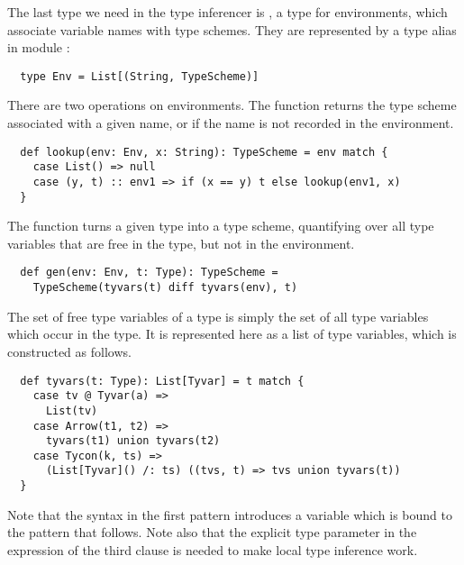 {The last type we need in the type inferencer is
, a type for environments, which associate variable names
with type schemes. They are represented by a type alias  in
module :
\begin{lstlisting}
  type Env = List[(String, TypeScheme)]
\end{lstlisting}
There are two operations on environments. The  function
returns the type scheme associated with a given name, or 
if the name is not recorded in the environment.
\begin{lstlisting}
  def lookup(env: Env, x: String): TypeScheme = env match {
    case List() => null
    case (y, t) :: env1 => if (x == y) t else lookup(env1, x)
  }
\end{lstlisting}
The  function turns a given type into a type scheme,
quantifying over all type variables that are free in the type, but
not in the environment.
\begin{lstlisting}
  def gen(env: Env, t: Type): TypeScheme = 
    TypeScheme(tyvars(t) diff tyvars(env), t)
\end{lstlisting}
The set of free type variables of a type is simply the set of all type
variables which occur in the type. It is represented here as a list of
type variables, which is constructed as follows.
\begin{lstlisting}
  def tyvars(t: Type): List[Tyvar] = t match {
    case tv @ Tyvar(a) => 
      List(tv)
    case Arrow(t1, t2) => 
      tyvars(t1) union tyvars(t2)
    case Tycon(k, ts) => 
      (List[Tyvar]() /: ts) ((tvs, t) => tvs union tyvars(t))
  }
\end{lstlisting}
Note that the syntax  in the first pattern introduces a variable
which is bound to the pattern that follows. Note also that the explicit type parameter \code{[Tyvar]} in the expression of the third
clause is needed to make local type inference work.

}
